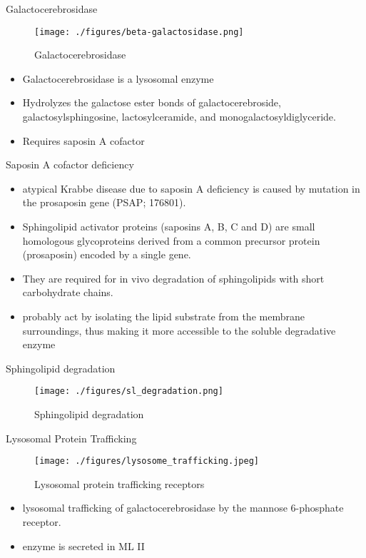 \documentclass[presentation, smaller]{beamer}
\begin{document}
\begin{frame}[label={sec:org8d2b867}]{Galactocerebrosidase}
\begin{figure}[htbp]
\centering
\texttt{[image: ./figures/beta-galactosidase.png]}
\caption{\label{fig:orgdc0415e}
Galactocerebrosidase}
\end{figure}

\begin{itemize}
\item Galactocerebrosidase is a lysosomal enzyme
\item Hydrolyzes the galactose ester bonds of galactocerebroside, galactosylsphingosine, lactosylceramide, and monogalactosyldiglyceride.
\item Requires saposin A cofactor
\end{itemize}
\end{frame}
\begin{frame}[label={sec:org70b1e45}]{Saposin A cofactor deficiency}
\begin{itemize}
\item atypical Krabbe disease due to saposin A deficiency is caused by mutation in the prosaposin gene (PSAP; 176801).
\item Sphingolipid activator proteins (saposins A, B, C and D) are small
homologous glycoproteins derived from a common precursor protein
(prosaposin) encoded by a single gene.
\item They are required for in vivo degradation of sphingolipids with short carbohydrate chains.
\item probably act by isolating the lipid substrate from the membrane
surroundings, thus making it more accessible to the soluble
degradative enzyme
\end{itemize}
\end{frame}

\begin{frame}[label={sec:orgec48afd}]{Sphingolipid degradation}
\begin{figure}[htbp]
\centering
\texttt{[image: ./figures/sl\_degradation.png]}
\caption[deg]{\label{fig:orge95ae29}
Sphingolipid degradation}
\end{figure}
\end{frame}

\begin{frame}[label={sec:orgbd90334}]{Lysosomal Protein Trafficking}
\begin{figure}[htbp]
\centering
\texttt{[image: ./figures/lysosome\_trafficking.jpeg]}
\caption[traf]{\label{fig:org598a03c}
Lysosomal protein trafficking receptors}
\end{figure}

\footnotesize
\begin{itemize}
\item lysosomal trafficking of galactocerebrosidase by the mannose 6-phosphate receptor.
\item enzyme is secreted in ML II
\end{itemize}
\end{frame}
\end{document}

